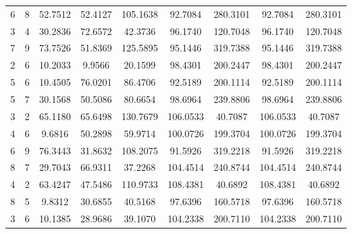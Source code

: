 \documentclass[withoutpreface,bwprint]{cumcmthesis} %
\begin{document}
\begin{appendices}
\begin{table}[htbp!]
\begin{tabular}{@{}ccccccccc@{}}
								6              & 8              & 52.7512     & 52.4127     & 105.1638    & 92.7084         & 280.3101        & 92.7084         & 280.3101        \\
								3              & 4              & 30.2836     & 72.6572     & 42.3736     & 96.1740         & 120.7048        & 96.1740         & 120.7048        \\
								7              & 9              & 73.7526     & 51.8369     & 125.5895    & 95.1446         & 319.7388        & 95.1446         & 319.7388        \\
								2              & 6              & 10.2033     & 9.9566      & 20.1599     & 98.4301         & 200.2447        & 98.4301         & 200.2447        \\
								5              & 6              & 10.4505     & 76.0201     & 86.4706     & 92.5189         & 200.1114        & 92.5189         & 200.1114        \\
								5              & 7              & 30.1568     & 50.5086     & 80.6654     & 98.6964         & 239.8806        & 98.6964         & 239.8806        \\
								3              & 2              & 65.1180     & 65.6498     & 130.7679    & 106.0533        & 40.7087         & 106.0533        & 40.7087         \\
								4              & 6              & 9.6816      & 50.2898     & 59.9714     & 100.0726        & 199.3704        & 100.0726        & 199.3704        \\
								6              & 9              & 76.3443     & 31.8632     & 108.2075    & 91.5926         & 319.2218        & 91.5926         & 319.2218        \\
								8              & 7              & 29.7043     & 66.9311     & 37.2268     & 104.4514        & 240.8744        & 104.4514        & 240.8744        \\
								4              & 2              & 63.4247     & 47.5486     & 110.9733    & 108.4381        & 40.6892         & 108.4381        & 40.6892         \\
								8              & 5              & 9.8312      & 30.6855     & 40.5168     & 97.6396         & 160.5718        & 97.6396         & 160.5718        \\
								3              & 6              & 10.1385     & 28.9686     & 39.1070     & 104.2338        & 200.7110        & 104.2338        & 200.7110        \\ \bottomrule
							\end{tabular}
						\end{table}
				

\end{appendices}
\end{document}
